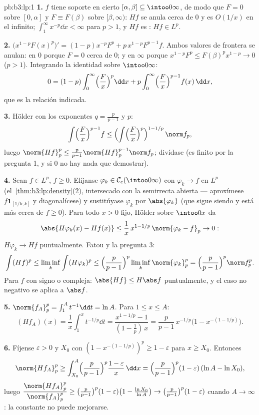 \begin{solution}{pb:b3:lp:1}
\textbf{1.} $f$ tiene soporte en cierto $[\alpha, \beta]
\subseteq \intoo0\infty$, de modo que $F = 0$ sobre $[0, \alpha]$ y $F
\equiv F(\beta)$ sobre $[\beta, \infty)$: $Hf$ se anula cerca de $0$ y
es $O(1/x)$ en el infinito; $\int_1^\infty x^{-p}\dd x <
\infty$ para $p > 1$, y $Hf$ es
: $Hf \in L^p$.

\textbf{2.} $\bigl(x^{1-p}F(x)^p\bigr)' = (1-p)x^{-p}F^p +
p\,x^{1-p}F^{p-1}f$. Ambos valores de frontera se anulan: en $0$ porque
$F = 0$ cerca de $0$; y en $\infty$ porque $x^{1-p}F^p \leq
F(\beta)^p x^{1-p} \to 0$ ($p > 1$). Integrando la identidad sobre
$\intoo0\infty$:
\[
0 = (1 - p)\int_0^\infty\Bigl(\frac Fx\Bigr)^p\dd x
+ p\int_0^\infty\Bigl(\frac Fx\Bigr)^{p-1}f(x)\,\dd x,
\]
que es la relación indicada.

\textbf{3.} Hölder con los exponentes $q = \frac p{p-1}$ y $p$:
\[
\int\Bigl(\frac Fx\Bigr)^{p-1}f
\leq \Bigl(\int\Bigl(\frac
Fx\Bigr)^{p}\Bigr)^{1 - 1/p}\,\norm f_p ,
\]
luego $\norm{Hf}_p^p \leq \frac p{p-1}\norm{Hf}_p^{p-1}\norm
f_p$; divídase (es finito por la pregunta 1, y si $0$ no hay nada que
demostrar).

\textbf{4.} Sean $f \in L^p$, $f \geq 0$. Elíjanse $\varphi_k \in
\mathcal C_c(\intoo0\infty)$ con $\varphi_k \to f$ en $L^p$
(el~\cref{thm:b3:lp:density}(2), intersecado con la semirrecta abierta
--- aproxímese $f\mathbf 1_{[1/k, k]}$ y diagonalícese) y sustitúyase
$\varphi_k$ por $\abs{\varphi_k}$ (que sigue siendo
 y está más cerca de
$f \geq 0$). Para todo $x > 0$ fijo, Hölder sobre $\intoo0x$ da
\[
\abs{H\varphi_k(x) - Hf(x)} \leq
\frac1x\,x^{1 - 1/p}\,\norm{\varphi_k - f}_p \to 0 :
\]
$H\varphi_k \to Hf$ puntualmente. Fatou y la pregunta 3:
\[
\int (Hf)^p \leq \liminf_k\int(H\varphi_k)^p
\leq \Bigl(\frac p{p-1}\Bigr)^p\liminf_k\norm{\varphi_k}_p^p
= \Bigl(\frac p{p-1}\Bigr)^p\norm f_p^p .
\]
Para $f$ con signo o compleja: $\abs{Hf} \leq H\abs f$ puntualmente, y
el caso no negativo se aplica a $\abs f$.

\textbf{5.} $\norm{f_A}_p^p = \int_1^A t^{-1}\dd t = \ln A$.
Para $1 \leq x \leq A$:
\[
(Hf_A)(x) = \frac1x\int_1^x t^{-1/p}\dd t
= \frac{x^{1 - 1/p} - 1}{(1 - \tfrac1p)\,x}
= \frac p{p-1}\,x^{-1/p}\bigl(1 - x^{-(1 - 1/p)}\bigr).
\]

\textbf{6.} Fíjense $\varepsilon > 0$ y $X_0$ con $(1 -
x^{-(1-1/p)})^p \geq 1 - \varepsilon$ para $x \geq X_0$. Entonces
\[
\norm{Hf_A}_p^p \geq \int_{X_0}^A\Bigl(\frac
p{p-1}\Bigr)^p\frac{1 - \varepsilon}{x}\,\dd x
= \Bigl(\frac p{p-1}\Bigr)^p(1 - \varepsilon)\,(\ln A - \ln
X_0),
\]
luego $\dfrac{\norm{Hf_A}_p^p}{\norm{f_A}_p^p} \geq \bigl(\frac
p{p-1}\bigr)^p(1 - \varepsilon)\bigl(1 - \frac{\ln X_0}{\ln
A}\bigr) \to \bigl(\frac p{p-1}\bigr)^p(1 - \varepsilon)$ cuando
$A \to \infty$: la constante no puede mejorarse.


\end{solution}

